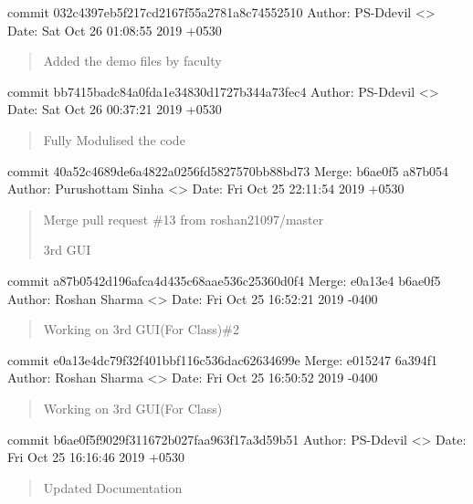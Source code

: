 \documentclass[letterpaper,10pt,english]{sphinxmanual}
\begin{document}
commit 032c4397eb5f217cd2167f55a2781a8c74552510
Author: PS-Ddevil \textless{}\textgreater{}
Date:   Sat Oct 26 01:08:55 2019 +0530
\begin{quote}

Added the demo files by faculty
\end{quote}

commit bb7415badc84a0fda1e34830d1727b344a73fec4
Author: PS-Ddevil \textless{}\textgreater{}
Date:   Sat Oct 26 00:37:21 2019 +0530
\begin{quote}

Fully Modulised the code
\end{quote}

commit 40a52c4689de6a4822a0256fd5827570bb88bd73
Merge: b6ae0f5 a87b054
Author: Purushottam Sinha \textless{}\textgreater{}
Date:   Fri Oct 25 22:11:54 2019 +0530
\begin{quote}

Merge pull request \#13 from roshan21097/master

3rd GUI
\end{quote}

commit a87b0542d196afca4d435c68aae536c25360d0f4
Merge: e0a13e4 b6ae0f5
Author: Roshan Sharma \textless{}\textgreater{}
Date:   Fri Oct 25 16:52:21 2019 -0400
\begin{quote}

Working on 3rd GUI(For Class)\#2
\end{quote}

commit e0a13e4dc79f32f401bbf116c536dac62634699e
Merge: e015247 6a394f1
Author: Roshan Sharma \textless{}\textgreater{}
Date:   Fri Oct 25 16:50:52 2019 -0400
\begin{quote}

Working on 3rd GUI(For Class)
\end{quote}

commit b6ae0f5f9029f311672b027faa963f17a3d59b51
Author: PS-Ddevil \textless{}\textgreater{}
Date:   Fri Oct 25 16:16:46 2019 +0530
\begin{quote}

Updated Documentation
\end{quote}
\end{document}
